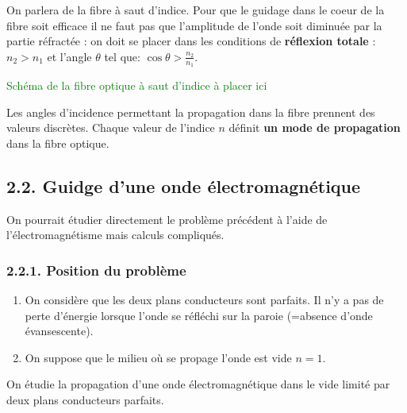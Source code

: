 \documentclass[french, a4paper, 10pt, twocolumn, landscape]{article}
\begin{document}
On parlera de la fibre à saut d'indice. Pour que le guidage dans le coeur de la fibre soit efficace il ne faut pas que l'amplitude de l'onde soit diminuée par la partie réfractée : on doit se placer dans les conditions de \textbf{réflexion totale} : $n_2>n_1$ et l'angle $\theta$ tel que: $\cos\theta > \frac{n_2}{n_1}$.

\textcolor{green}{Schéma de la fibre optique à saut d'indice à placer ici}

Les angles d'incidence permettant la propagation dans la fibre prennent des valeurs discrètes. Chaque valeur de l'indice $n$ définit \textbf{un mode de propagation} dans la fibre optique.

\subsection*{2.2. Guidge d'une onde électromagnétique}

On pourrait étudier directement le problème précédent à l'aide de l'électromagnétisme mais calculs compliqués.

\subsubsection*{2.2.1. Position du problème}

\begin{enumerate}
	\item On considère que les deux plans conducteurs sont parfaits. Il n'y a pas de perte d'énergie lorsque l'onde se réfléchi sur la paroie (=absence d'onde évansescente).
	\item On suppose que le milieu où se propage l'onde est vide $n=1$.
\end{enumerate}

\begin{definition}{}
	On étudie la propagation d'une onde électromagnétique dans le vide limité par deux plans conducteurs parfaits.
\end{definition}



\end{document}

